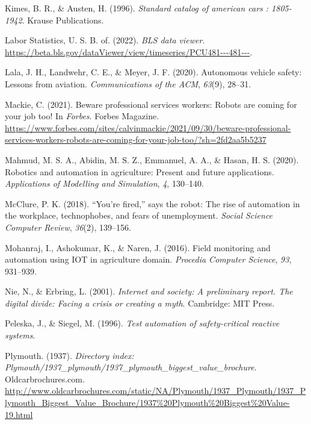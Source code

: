 \documentclass[
  man,floatsintext]{apa7}
\newlength{\cslhangindent}
\newlength{\cslentryspacingunit} %
\newenvironment{CSLReferences}[2] %
 {%
  \setlength{\parindent}{0pt}
  \ifodd #1
  \let\oldpar\par
  \def\par{\hangindent=\cslhangindent\oldpar}
  \fi
  \setlength{\parskip}{#2\cslentryspacingunit}
 }%
 {}
\begin{document}
\begin{CSLReferences}{1}{0}
\leavevmode{}%
Kimes, B. R., \& Austen, H. (1996). \emph{Standard catalog of american cars : 1805-1942}. Krause Publications.

\leavevmode{}%
Labor Statistics, U. S. B. of. (2022). \emph{BLS data viewer}. \url{https://beta.bls.gov/dataViewer/view/timeseries/PCU481---481---}.

\leavevmode{}%
Lala, J. H., Landwehr, C. E., \& Meyer, J. F. (2020). Autonomous vehicle safety: Lessons from aviation. \emph{Communications of the ACM}, \emph{63}(9), 28--31.

\leavevmode{}%
Mackie, C. (2021). Beware professional services workers: Robots are coming for your job too! In \emph{Forbes}. Forbes Magazine. \url{https://www.forbes.com/sites/calvinmackie/2021/09/30/beware-professional-services-workers-robots-are-coming-for-your-job-too/?sh=2fd2aa5b5237}

\leavevmode{}%
Mahmud, M. S. A., Abidin, M. S. Z., Emmanuel, A. A., \& Hasan, H. S. (2020). Robotics and automation in agriculture: Present and future applications. \emph{Applications of Modelling and Simulation}, \emph{4}, 130--140.

\leavevmode{}%
McClure, P. K. (2018). {``You're fired,''} says the robot: The rise of automation in the workplace, technophobes, and fears of unemployment. \emph{Social Science Computer Review}, \emph{36}(2), 139--156.

\leavevmode{}%
Mohanraj, I., Ashokumar, K., \& Naren, J. (2016). Field monitoring and automation using IOT in agriculture domain. \emph{Procedia Computer Science}, \emph{93}, 931--939.

\leavevmode{}%
Nie, N., \& Erbring, L. (2001). \emph{Internet and society: A preliminary report. The digital divide: Facing a crisis or creating a myth}. Cambridge: MIT Press.

\leavevmode{}%
Peleska, J., \& Siegel, M. (1996). \emph{Test automation of safety-critical reactive systems}.

\leavevmode{}%
Plymouth. (1937). \emph{Directory index: Plymouth/1937\_plymouth/1937\_plymouth\_biggest\_value\_brochure}. Oldcarbrochures.com. \url{http://www.oldcarbrochures.com/static/NA/Plymouth/1937_Plymouth/1937_Plymouth_Biggest_Value_Brochure/1937\%20Plymouth\%20Biggest\%20Value-19.html}


\end{CSLReferences}
\end{document}
